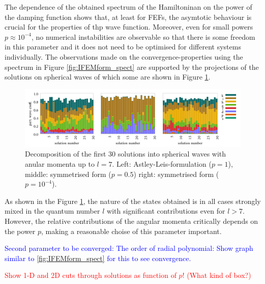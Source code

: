 The dependence of the obtained spectrum of the Hamiltoninan on the power of the damping function shows that, at least for FEFs, the asymtotic behaviour is crucial for the properties of thp wave function. 
Moreover, even for small powers $p\approx 10^{-4}$, no numerical instabilities are observable so that there is some freedom in this parameter and it does not need to be optimised for different systems individually.
The observations made on the convergence-properties using the spectrum in Figure \ref{fig:IFEMform_spect} are supported by the projections of the solutions on spherical waves of which some are shown in Figure \ref{fig:IFEMform_project}.
\begin{figure}
\includegraphics[width=\textwidth]{Figures/Ifem_forms}
\caption{Decomposition of the first 30 solutions into spherical waves with anular momenta up to $l=7$.
Left: Astley-Leis-formulation ($p=1$), middle: symmetrised form ($p=0.5$) right: symmetrised form ($p=10^{-4}$).}
\label{fig:IFEMform_project}
\end{figure}

As shown in the Figure \ref{fig:IFEMform_project}, the nature of the states obtained is in all cases strongly mixed in the quantum number $l$ with significant contributions even for $l>7$.
However, the relative contributions of the angular momenta critically depends on the power $p$, making a reasonable choise of this parameter important.

\textcolor{blue}{Second parameter to be converged: The order of radial polynomial: Show graph similar to \ref{fig:IFEMform_spect} for this to see convergence.}

\textcolor{red}{Show 1-D and 2D cuts through solutions as function of $p$!  (What kind of box?)}

